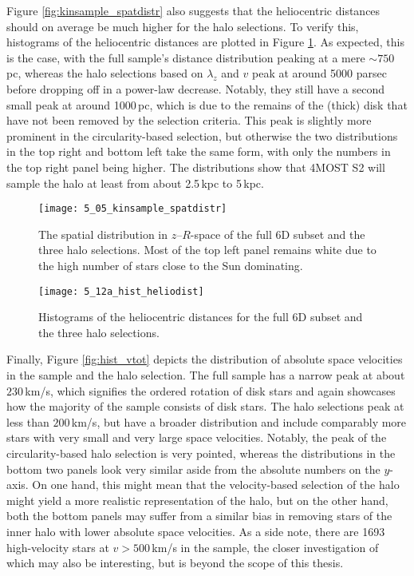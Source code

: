 \documentclass[a4paper,11pt]{article}
\begin{document}
Figure \ref{fig:kinsample_spatdistr} also suggests that the heliocentric distances should on average be much higher for the halo selections. To verify this, histograms of the heliocentric distances are plotted in Figure \ref{fig:hist_heliodist}. As expected, this is the case, with the full sample's distance distribution peaking at a mere ${\sim}750$\,pc, whereas the halo selections based on $\lambda_z$ and $v$ peak at around 5000 parsec before dropping off in a power-law decrease. Notably, they still have a second small peak at around 1000\,pc, which is due to the remains of the (thick) disk that have not been removed by the selection criteria. This peak is slightly more prominent in the circularity-based selection, but otherwise the two distributions in the top right and bottom left take the same form, with only the numbers in the top right panel being higher. The distributions show that 4MOST S2 will sample the halo at least from about 2.5\,kpc to 5\,kpc.
%
\begin{figure}[H]
 \begin{minipage}[t]{\textwidth}
 \centering
 \texttt{[image: 5\_05\_kinsample\_spatdistr]}
 \caption[Spatial distribution of 6D subset and halo selections]{The spatial distribution in $z$--$R$-space of the full 6D subset and the three halo selections. Most of the top left panel remains white due to the high number of stars close to the Sun dominating.}
 \label{fig:kinsample_spatdistr}
 \end{minipage}
 \begin{minipage}[t]{\textwidth}
 \centering
 \texttt{[image: 5\_12a\_hist\_heliodist]}
 \caption[Heliocentric distances of 6D subset and halo selections]{Histograms of the heliocentric distances for the full 6D subset and the three halo selections.}
 \label{fig:hist_heliodist}
 \end{minipage}
\end{figure}
%
\noindent
Finally, Figure \ref{fig:hist_vtot} depicts the distribution of absolute space velocities in the sample and the halo selection. The full sample has a narrow peak at about $230$\,km/s, which signifies the ordered rotation of disk stars and again showcases how the majority of the sample consists of disk stars. The halo selections peak at less than $200$\,km/s, but have a broader distribution and include comparably more stars with very small and very large space velocities. Notably, the peak of the circularity-based halo selection is very pointed, whereas the distributions in the bottom two panels look very similar aside from the absolute numbers on the $y$-axis. On one hand, this might mean that the velocity-based selection of the halo might yield a more realistic representation of the halo, but on the other hand, both the bottom panels may suffer from a similar bias in removing stars of the inner halo with lower absolute space velocities. As a side note, there are 1693 high-velocity stars at $v>500$\,km/s in the sample, the closer investigation of which may also be interesting, but is beyond the scope of this thesis.
\end{document}

